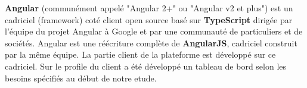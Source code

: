 \textbf{Angular} (communément appelé "Angular 2+" ou "Angular v2 et plus") est un cadriciel (framework) coté client open source basé sur \textbf{TypeScript} dirigée par l'équipe du projet Angular à Google et par une communauté de particuliers et de sociétés. Angular est une réécriture complète de \textbf{AngularJS}, cadriciel construit par la même équipe. La partie client de la plateforme est développé sur ce cadriciel. Sur le profile du client a été développé un tableau de bord selon les besoins spécifiés au début de notre etude.\\
